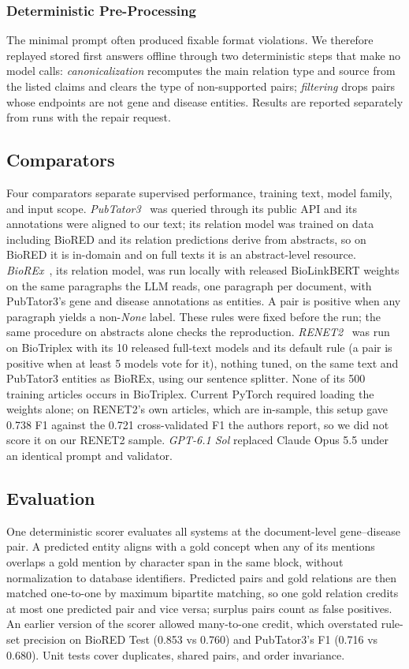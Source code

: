 \documentclass[preprint,10pt,letterpaper]{elsarticle}
\begin{document}
\subsubsection{Deterministic Pre-Processing}
The minimal prompt often produced fixable format violations. We therefore replayed stored first answers offline through two deterministic steps that make no model calls: \emph{canonicalization} recomputes the main relation type and source from the listed claims and clears the type of non-supported pairs; \emph{filtering} drops pairs whose endpoints are not gene and disease entities. Results are reported separately from runs with the repair request.

\subsection{Comparators}
Four comparators separate supervised performance, training text, model family, and input scope. \emph{PubTator3}~\cite{wei2024pubtator3} was queried through its public API and its annotations were aligned to our text; its relation model was trained on data including BioRED and its relation predictions derive from abstracts, so on BioRED it is in-domain and on full texts it is an abstract-level resource. \emph{BioREx}~\cite{lai2023biorex}, its relation model, was run locally with released BioLinkBERT weights on the same paragraphs the LLM reads, one paragraph per document, with PubTator3's gene and disease annotations as entities. A pair is positive when any paragraph yields a non-\emph{None} label. These rules were fixed before the run; the same procedure on abstracts alone checks the reproduction. \emph{RENET2}~\cite{su2021renet2} was run on BioTriplex with its 10 released full-text models and its default rule (a pair is positive when at least 5 models vote for it), nothing tuned, on the same text and PubTator3 entities as BioREx, using our sentence splitter. None of its 500 training articles occurs in BioTriplex. Current PyTorch required loading the weights alone; on RENET2's own articles, which are in-sample, this setup gave 0.738 F1 against the 0.721 cross-validated F1 the authors report, so we did not score it on our RENET2 sample. \emph{GPT-6.1 Sol} replaced Claude Opus 5.5 under an identical prompt and validator.

\subsection{Evaluation}\label{sec:eval}
One deterministic scorer evaluates all systems at the document-level gene--disease pair. A predicted entity aligns with a gold concept when any of its mentions overlaps a gold mention by character span in the same block, without normalization to database identifiers. Predicted pairs and gold relations are then matched one-to-one by maximum bipartite matching, so one gold relation credits at most one predicted pair and vice versa; surplus pairs count as false positives. An earlier version of the scorer allowed many-to-one credit, which overstated rule-set precision on BioRED Test (0.853 vs 0.760) and PubTator3's F1 (0.716 vs 0.680). Unit tests cover duplicates, shared pairs, and order invariance.
\end{document}
